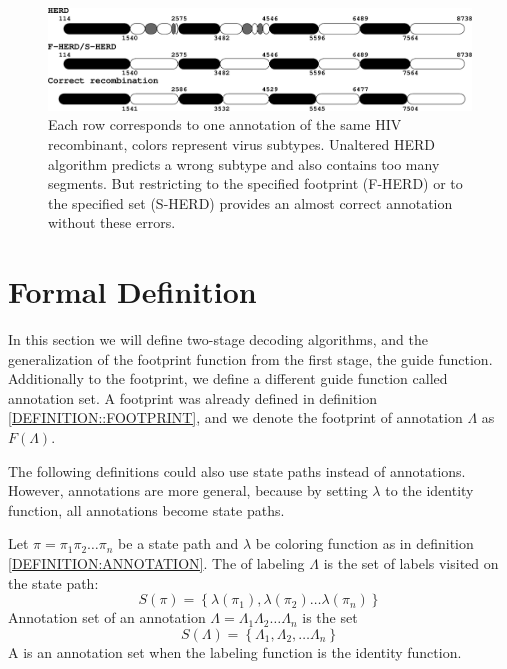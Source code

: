 \begin{figure}
\begin{center}
\includegraphics[width=14cm]{../figures/jcss/happyStory.pdf}
\end{center}
\caption[Example of annotation with systematic error.]{ 
Each row corresponds to one annotation of the same HIV recombinant, colors
represent virus subtypes. Unaltered HERD algorithm predicts a wrong
subtype and also contains too many segments. But restricting to the specified
footprint (F-HERD) or to the specified set (S-HERD) provides an almost correct
annotation without these errors.  }\label{FIGURE:HERD_BAD} 
\end{figure}

\section{Formal Definition}
In this section we will define two-stage decoding algorithms, and the
generalization of the footprint function from the first stage, the guide
function. Additionally to the footprint, we define a different guide function called
annotation set. A footprint was already defined in definition
\ref{DEFINITION::FOOTPRINT}, and we denote the footprint of annotation
$\Lambda$ as $F(\Lambda)$. 

\begin{note}
The following definitions could also use state paths instead of 
annotations. However, annotations are more general, because by setting
$\lambda$ to the identity function, all annotations become state paths.
\end{note}

\begin{definition}
Let $\pi = \pi_1\pi_2\dots \pi_n$ be a state path and $\lambda$ be coloring
function as in definition \ref{DEFINITION:ANNOTATION}.  The
 of labeling $\Lambda$ is the set of labels visited
on the state path:
\[S(\pi) = \left\{\lambda(\pi_1), \lambda(\pi_2)\dots\lambda(\pi_n)\right\}\]
Annotation set of an annotation $\Lambda = \Lambda_1\Lambda_2\dots \Lambda_n$
is the set
\[S(\Lambda) =
\left\{\Lambda_1,\Lambda_2,\dots\Lambda_n\right\}\]
A  is an annotation set when the labeling function is the
identity function.\label{DEFINITION:ANNOTATION_SET}
\end{definition}


